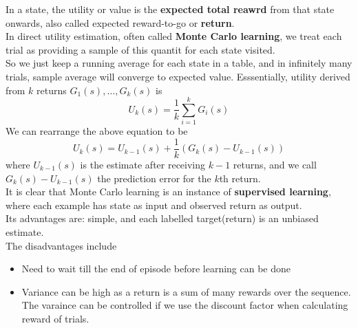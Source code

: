 \documentclass[12pt]{article}
\theoremstyle{definition}
\begin{document}
In a state, the utility or value is the \textbf{expected total reawrd} from that state onwards, also called expected reward-to-go or \textbf{return}.\\
In direct utility estimation, often called \textbf{Monte Carlo learning}, we treat each trial as providing a sample of this quantit for each state visited.\\
So we just keep a running average for each state in a table, and in infinitely many trials, sample average will converge to expected value. Esssentially, utility derived from $k$ returns $G_1(s), \ldots, G_k(s)$ is
\[
U_k(s)=\frac{1}{k}\sum_{i=1}^k G_i(s)
\]
We can rearrange the above equation to be
\[
U_k(s)=U_{k-1}(s)+\frac{1}{k}(G_k(s)-U_{k-1}(s))
\]
where $U_{k-1}(s)$ is the estimate after receiving $k-1$ returns, and we call $G_k(s)-U_{k-1}(s)$ the prediction error for the $k$th return.\\
It is clear that Monte Carlo learning is an instance of \textbf{supervised learning}, where each example has state as input and observed return as output.\\
Its advantages are: simple, and each labelled target(return) is an unbiased estimate.\\
The disadvantages include
\begin{itemize}
	\item Need to wait till the end of episode before learning can be done
	\item Variance can be high as a return is a sum of many rewards over the sequence. The varaince can be controlled if we use the discount factor when calculating reward of trials.
\end{itemize}
\end{document}
